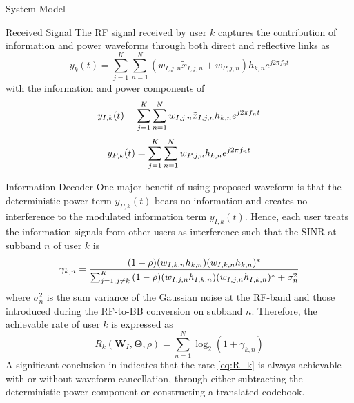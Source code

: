 \documentclass{IEEEtran}
\begin{document}
\begin{section}{System Model}
	\begin{subsection}{Received Signal}
		The RF signal received by user $k$ captures the contribution of information and power waveforms through both direct and reflective links as
		\begin{equation}\label{eq:y_k(t)}
			y_k(t)=\sum_{j=1}^K\sum_{n=1}^N(w_{I,j,n}\tilde{x}_{I,j,n}+w_{P,j,n})h_{k,n}{e^{j2{\pi}{f_n}{t}}}
		\end{equation}
		with the information and power components of
		\begin{equation}\label{eq:y_{I,k}(t)}
			y_{I,k}(t)=\sum_{j=1}^K\sum_{n=1}^N{w_{I,j,n}\tilde{x}_{I,j,n}}h_{k,n}{e^{j2{\pi}{f_n}{t}}}
		\end{equation}
		\begin{equation}\label{eq:y_{P,k}(t)}
			y_{P,k}(t)=\sum_{j=1}^K\sum_{n=1}^N{w_{P,j,n}}h_{k,n}{e^{j2{\pi}{f_n}{t}}}
		\end{equation}

	\end{subsection}

	\begin{subsection}{Information Decoder}
		One major benefit of using proposed waveform is that the deterministic power term $y_{P,k}(t)$ bears no information and creates no interference to the modulated information term $y_{I,k}(t)$. Hence, each user treats the information signals from other users as interference such that the SINR at subband $n$ of user $k$ is
		\begin{equation}\label{eq:gamma_{k,n}}
			\gamma_{k,n}=\frac{(1-\rho)(w_{I,k,n}h_{k,n})(w_{I,k,n}h_{k,n})^*}{\sum_{j=1,j{\ne}k}^K{(1-\rho)(w_{I,j,n}h_{I,k,n})(w_{I,j,n}h_{I,k,n})^*+\sigma_n^2}}
		\end{equation}
		where $\sigma_n^2$ is the sum variance of the Gaussian noise at the RF-band and those introduced during the RF-to-BB conversion on subband $n$. Therefore, the achievable rate of user $k$ is expressed as
		\begin{equation}\label{eq:R_k}
			R_k(\boldsymbol{W}_I,\boldsymbol{\Theta},\rho)=\sum_{n=1}^N{\log_2(1+\gamma_{k,n})}
		\end{equation}
		A significant conclusion in \cite{Clerckx2018b} indicates that the rate \ref{eq:R_k} is always achievable with or without waveform cancellation, through either subtracting the deterministic power component or constructing a translated codebook.
	\end{subsection}


\end{section}
\end{document}
